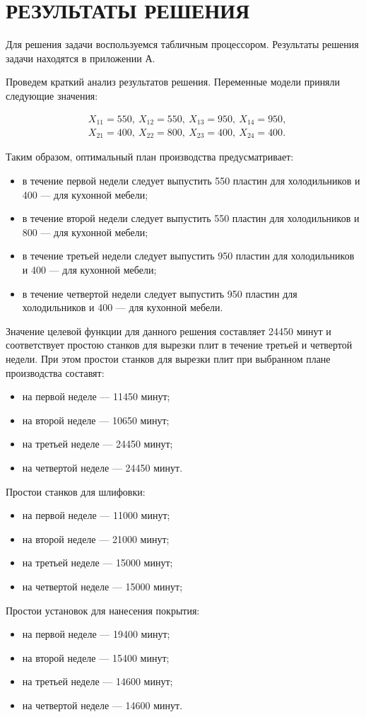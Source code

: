 \section{РЕЗУЛЬТАТЫ РЕШЕНИЯ}

Для решения задачи воспользуемся табличным процессором.
Результаты решения задачи находятся в приложении А.

Проведем краткий анализ результатов решения.
Переменные модели приняли следующие значения:
\begin{small}
  \begin{align*}
    & X_{11} = 550, \: X_{12} = 550, \: X_{13} = 950, \: X_{14} = 950, \\
    & X_{21} = 400, \: X_{22} = 800, \: X_{23} = 400, \: X_{24} = 400.
  \end{align*}
\end{small}

\vspace{-7mm}

Таким образом, оптимальный план производства предусматривает:
\begin{itemize}
\item в течение первой недели следует выпустить 
  550 пластин для холодильников и 400 --- для кухонной мебели;
\item в течение второй недели следует выпустить 
  550 пластин для холодильников и 800 --- для кухонной мебели;
\item в течение третьей недели следует выпустить 
  950 пластин для холодильников и 400 --- для кухонной мебели;
\item в течение четвертой недели следует выпустить 
  950 пластин для холодильников и 400 --- для кухонной мебели.
\end{itemize}

Значение целевой функции для данного решения составляет 24450 минут и
соответствует простою станков для вырезки плит в течение третьей и четвертой недели.
При этом простои станков для вырезки плит при выбранном плане производства составят:
\begin{itemize}
\item на первой неделе --- 11450 минут;
\item на второй неделе --- 10650 минут;
\item на третьей неделе --- 24450 минут;
\item на четвертой неделе --- 24450 минут.
\end{itemize}

Простои станков для шлифовки:
\begin{itemize}
\item на первой неделе --- 11000 минут;
\item на второй неделе --- 21000 минут;
\item на третьей неделе --- 15000 минут;
\item на четвертой неделе --- 15000 минут;
\end{itemize}

Простои установок для нанесения покрытия:
\begin{itemize}
\item на первой неделе --- 19400 минут;
\item на второй неделе --- 15400 минут;
\item на третьей неделе --- 14600 минут;
\item на четвертой неделе --- 14600 минут.
\end{itemize}

\newpage